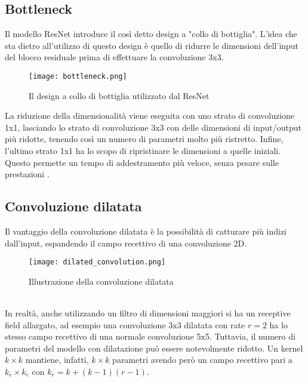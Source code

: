 \subsection{Bottleneck}
Il modello ResNet introduce il così detto design a "collo di bottiglia". L'idea che sta dietro all'utilizzo di questo design è quello di ridurre le dimensioni dell'input del blocco residuale prima di effettuare la convoluzione 3x3.  
\begin{figure}[ht]
    \centering
    \texttt{[image: bottleneck.png]}
    \caption[Bottleneck]{Il design a collo di bottiglia utilizzato dal  ResNet}
\end{figure}
La riduzione della dimensionalità viene eseguita con uno strato di convoluzione 1x1, lasciando lo strato di convoluzione 3x3 con delle dimensioni di input/output più ridotte, tenendo così un numero di parametri molto più ristretto. Infine, l'ultimo strato 1x1 ha lo scopo di ripristinare le dimensioni a quelle iniziali. Questo permette un tempo di addestramento più veloce, senza pesare sulle prestazioni \cite{resnet}.

\subsection{Convoluzione dilatata}
Il vantaggio della convoluzione dilatata è la possibilità di catturare più indizi dall'input, espandendo il campo recettivo di una convoluzione 2D. 
\begin{figure}[ht]
    \centering
    \texttt{[image: dilated\_convolution.png]}
    \caption[Convoluzione dilatata]{Illustrazione della convoluzione dilatata}
\end{figure}\\
In realtà, anche utilizzando un filtro di dimensioni maggiori si ha un receptive field allargato, ad esempio una convoluzione 3x3 dilatata con rate $r=2$ ha lo stesso campo recettivo di una normale convoluzione 5x5. Tuttavia, il numero di parametri del modello con dilatazione può essere notevolmente ridotto. Un kernel $k\times k$ mantiene, infatti, $k\times k$ parametri avendo però un campo recettivo pari a $k_e\times k_e$ con $k_e=k+(k-1)(r-1)$.

